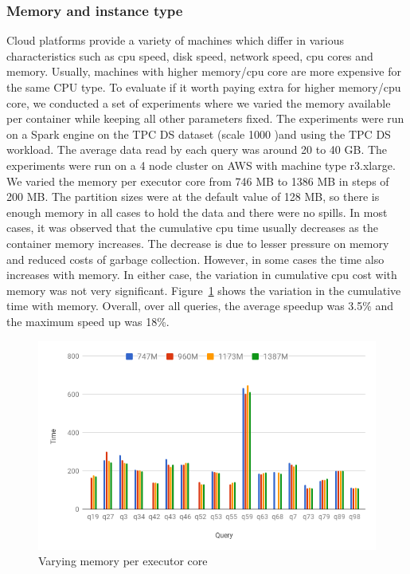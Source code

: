 \noindent\subsubsection*{Memory and instance type}
Cloud platforms provide a variety of machines which differ in various characteristics such as cpu speed, disk speed, network speed, cpu cores and memory. Usually, machines with higher memory/cpu core are more expensive for the same CPU type. To evaluate if it worth paying extra for higher memory/cpu core, we conducted a set of experiments where we varied the memory available per container while keeping all other parameters fixed. The experiments were run on a Spark engine on the TPC DS dataset (scale 1000 )and using the TPC DS workload. The average data read by each query was around 20 to 40 GB. The experiments were run on a 4 node cluster on AWS with machine type r3.xlarge. We varied the memory per executor core from 746 MB to 1386 MB in steps of 200 MB. The partition sizes were at the default value of 128 MB, so there is enough memory in all cases to hold the data and there were no spills. In most cases, it was observed that the cumulative cpu time usually decreases as the container memory increases. The decrease is due to lesser pressure on memory and reduced costs of garbage collection. However, in some cases the time also increases with memory. In either case, the variation in cumulative cpu cost with memory was not very significant. Figure~\ref{fig:varymem} shows the variation in the cumulative time with memory. Overall, over all queries, the average speedup was 3.5\% and the maximum speed up was 18\%. 

\begin{figure}[h]
	\includegraphics[width=\linewidth]{fig/varymem.png}
	\caption{Varying memory per executor core}
	\label{fig:varymem}
\end{figure}

